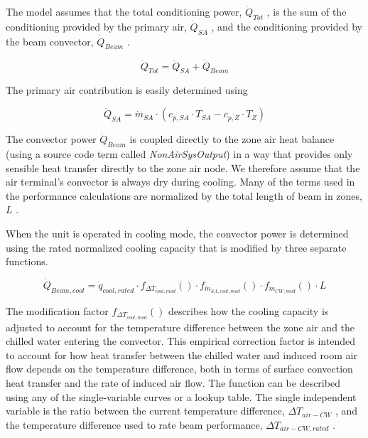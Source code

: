 The model assumes that the total conditioning power, \({\dot Q_{Tot}}\) , is the sum of the conditioning provided by the primary air, \({\dot Q_{SA}}\) , and the conditioning provided by the beam convector, \({\dot Q_{Beam}}\) .

\begin{equation}
{\dot Q_{Tot}} = {{\dot Q_{SA}} + {\dot Q_{Beam}}}
\end{equation}

The primary air contribution is easily determined using

\begin{equation}
{\dot Q_{SA}} = {{\dot m_{SA}}\cdot ({c_{p,SA}} \cdot {T_{SA}} - {c_{p,Z}} \cdot {T_{Z}})}
\end{equation}

The convector power \({\dot Q_{Beam}}\) is coupled directly to the zone air heat balance (using a source code term called \emph{NonAirSysOutput}) in a way that provides only sensible heat transfer directly to the zone air node. We therefore assume that the air terminal's convector is always dry during cooling. Many of the terms used in the performance calculations are normalized by the total length of beam in zones, \({L}\) .

When the unit is operated in cooling mode, the convector power is determined using the rated normalized cooling capacity that is modified by three separate functions.

\begin{equation}
{\dot Q_{Beam, cool}} = { \dot q_{cool,rated} \cdot f_{ \Delta T_{cool,mod} }() \cdot f_{\dot m_{SA,cool,mod}}() \cdot f_{\dot m_{CW,mod}}() \cdot L }
\end{equation}

The modification factor \({f_{ \Delta T_{cool,mod} }() }\) describes how the cooling capacity is adjusted to account for the temperature difference between the zone air and the chilled water entering the convector. This empirical correction factor is intended to account for how heat transfer between the chilled water and induced room air flow depends on the temperature difference, both in terms of surface convection heat transfer and the rate of induced air flow. The function can be described using any of the single-variable curves or a lookup table. The single independent variable is the ratio between the current temperature difference, \({\Delta T_{air-CW}}\) , and the temperature difference used to rate beam performance, \({\Delta T_{air-CW,rated}}\) .

